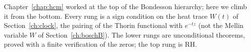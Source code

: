 \label{chap:heat}

Chapter~\ref{chap:hcm} worked at the top of the Bondesson hierarchy; here we climb it from the bottom. Every rung is a sign condition on the heat trace $W(t)$ of Section~\ref{ch:clock}, the pairing of the Thorin functional with $e^{-tz}$ (not the Mellin variable $W$ of Section~\ref{ch:boschB}). The lower rungs are unconditional theorems, proved with a finite verification of the zeros; the top rung is RH.

